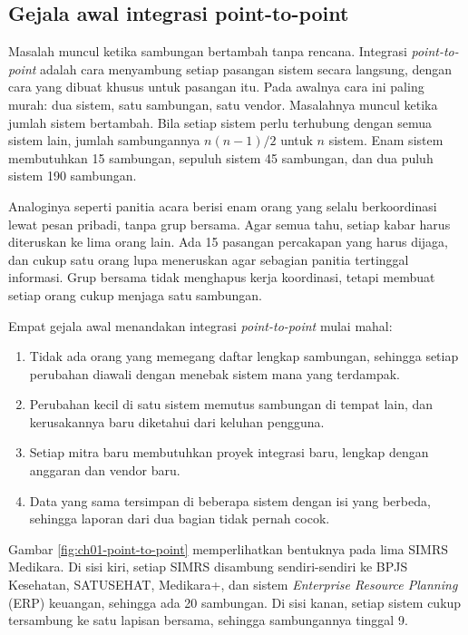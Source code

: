 \subsection*{Gejala awal integrasi point-to-point}

Masalah muncul ketika sambungan bertambah tanpa rencana. Integrasi
\textit{point-to-point} adalah cara menyambung setiap pasangan sistem secara
langsung, dengan cara yang dibuat khusus untuk pasangan itu. Pada awalnya cara
ini paling murah: dua sistem, satu sambungan, satu vendor. Masalahnya muncul
ketika jumlah sistem bertambah. Bila setiap sistem perlu terhubung dengan semua
sistem lain, jumlah sambungannya $n(n-1)/2$ untuk $n$ sistem. Enam sistem
membutuhkan 15 sambungan, sepuluh sistem 45 sambungan, dan dua puluh sistem 190
sambungan.

Analoginya seperti panitia acara berisi enam orang yang selalu berkoordinasi
lewat pesan pribadi, tanpa grup bersama. Agar semua tahu, setiap kabar harus
diteruskan ke lima orang lain. Ada 15 pasangan percakapan yang harus dijaga, dan
cukup satu orang lupa meneruskan agar sebagian panitia tertinggal informasi.
Grup bersama tidak menghapus kerja koordinasi, tetapi membuat setiap orang cukup
menjaga satu sambungan.

Empat gejala awal menandakan integrasi \textit{point-to-point} mulai mahal:

\begin{enumerate}
  \item Tidak ada orang yang memegang daftar lengkap sambungan, sehingga setiap
        perubahan diawali dengan menebak sistem mana yang terdampak.
  \item Perubahan kecil di satu sistem memutus sambungan di tempat lain, dan
        kerusakannya baru diketahui dari keluhan pengguna.
  \item Setiap mitra baru membutuhkan proyek integrasi baru, lengkap dengan
        anggaran dan vendor baru.
  \item Data yang sama tersimpan di beberapa sistem dengan isi yang berbeda,
        sehingga laporan dari dua bagian tidak pernah cocok.
\end{enumerate}

Gambar \ref{fig:ch01-point-to-point} memperlihatkan bentuknya pada lima SIMRS
Medikara. Di sisi kiri, setiap SIMRS disambung sendiri-sendiri ke BPJS Kesehatan,
SATUSEHAT, Medikara+, dan sistem \textit{Enterprise Resource Planning} (ERP)
keuangan, sehingga ada 20 sambungan. Di sisi kanan, setiap sistem cukup
tersambung ke satu lapisan bersama, sehingga sambungannya tinggal 9.

